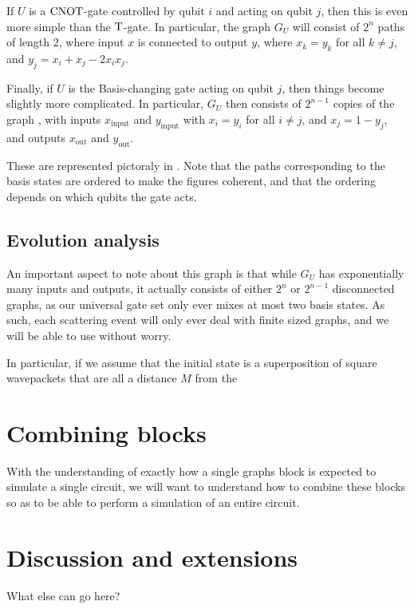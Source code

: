 \documentclass[../thesis-main/thesis-main]{subfiles}
\begin{document}
If $U$ is a $\mathrm{CNOT}$-gate controlled by qubit $i$ and acting on qubit $j$, then this is even more simple than the $\mathrm{T}$-gate.  In particular, the graph $G_U$ will consist of $2^n$ paths of length 2, where input $x$ is connected to output $y$, where $x_k = y_k$ for all $k\neq j$, and $y_j =x_i + x_j - 2 x_i x_j$. 

Finally, if $U$ is the Basis-changing gate acting on qubit $j$, then things become slightly more complicated.  In particular, $G_U$ then consists of $2^{n-1}$ copies of the graph , with inputs $x_{\text{input}}$ and $y_{\text{input}}$ with $x_i = y_i$ for all $i\neq j$, and $x_j = 1-y_j$, and outputs $x_{\text{out}}$ and $y_{\text{out}}$.

These are represented pictoraly in .  Note that the paths corresponding to the basis states are ordered to make the figures coherent, and that the ordering depends on which qubits the gate acts.



\subsection{Evolution analysis}

An important aspect to note about this graph is that while $G_U$ has exponentially many inputs and outputs, it actually consists of either $2^n$ or $2^{n-1}$ disconnected graphs, as our universal gate set only ever mixes at most two basis states.  As such, each scattering event will only ever deal with finite sized graphs, and we will be able to use  without worry.

In particular, if we assume that the initial state is a superposition of square wavepackets that are all a distance $M$ from the 



\section{Combining blocks}

With the understanding of exactly how a single graphs block is expected to simulate a single circuit, we will want to understand how to combine these blocks so as to be able to perform a simulation of an entire circuit.  






\section{Discussion and extensions}

What else can go here?


\biblio
\end{document}
